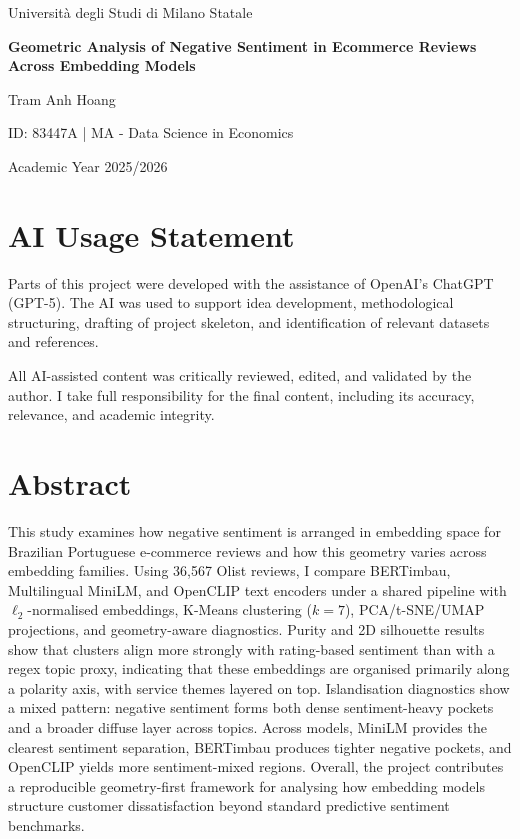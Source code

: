\documentclass[a4paper,11pt]{article}
\begin{document}
\begin{titlepage}
\centering
{\Large Università degli Studi di Milano Statale\par}
\vspace{1.5cm}
{\LARGE\bfseries Geometric Analysis of Negative Sentiment in Ecommerce Reviews Across Embedding Models\par}
\vspace{1.5cm}
{\large Tram Anh Hoang\par}
{\large ID: 83447A | MA - Data Science in Economics\par}
\vfill
{\large Academic Year 2025/2026\par}
\end{titlepage}
\clearpage
\section*{AI Usage Statement}
\noindent Parts of this project were developed with the assistance of OpenAI's ChatGPT (GPT-5). The AI was used to support idea development, methodological structuring, drafting of project skeleton, and identification of relevant datasets and references.

\noindent All AI-assisted content was critically reviewed, edited, and validated by the author. I take full responsibility for the final content, including its accuracy, relevance, and academic integrity.
\thispagestyle{empty}
\clearpage


\section*{Abstract}
\noindent This study examines how negative sentiment is arranged in embedding space for Brazilian Portuguese e-commerce reviews and how this geometry varies across embedding families. Using 36{,}567 Olist reviews, I compare BERTimbau, Multilingual MiniLM, and OpenCLIP text encoders under a shared pipeline with $\ell_2$-normalised embeddings, K-Means clustering ($k=7$), PCA/t-SNE/UMAP projections, and geometry-aware diagnostics. Purity and 2D silhouette results show that clusters align more strongly with rating-based sentiment than with a regex topic proxy, indicating that these embeddings are organised primarily along a polarity axis, with service themes layered on top. Islandisation diagnostics show a mixed pattern: negative sentiment forms both dense sentiment-heavy pockets and a broader diffuse layer across topics. Across models, MiniLM provides the clearest sentiment separation, BERTimbau produces tighter negative pockets, and OpenCLIP yields more sentiment-mixed regions. Overall, the project contributes a reproducible geometry-first framework for analysing how embedding models structure customer dissatisfaction beyond standard predictive sentiment benchmarks.
\end{document}
